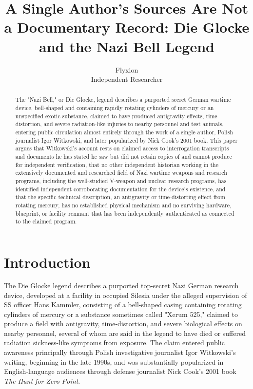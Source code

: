 \documentclass[11pt]{article}
\title{A Single Author's Sources Are Not a Documentary Record: Die Glocke and the Nazi Bell Legend}
\author{Flyxion \\ \small Independent Researcher}
\date{}
\begin{document}
\maketitle

\begin{abstract}
The "Nazi Bell," or Die Glocke, legend describes a purported secret German wartime device, bell-shaped and containing rapidly rotating cylinders of mercury or an unspecified exotic substance, claimed to have produced antigravity effects, time distortion, and severe radiation-like injuries to nearby personnel and test animals, entering public circulation almost entirely through the work of a single author, Polish journalist Igor Witkowski, and later popularized by Nick Cook's 2001 book. This paper argues that Witkowski's account rests on claimed access to interrogation transcripts and documents he has stated he saw but did not retain copies of and cannot produce for independent verification, that no other independent historian working in the extensively documented and researched field of Nazi wartime weapons and research programs, including the well-studied V-weapon and nuclear research programs, has identified independent corroborating documentation for the device's existence, and that the specific technical description, an antigravity or time-distorting effect from rotating mercury, has no established physical mechanism and no surviving hardware, blueprint, or facility remnant that has been independently authenticated as connected to the claimed program.
\end{abstract}

\section{Introduction}

The Die Glocke legend describes a purported top-secret Nazi German research device, developed at a facility in occupied Silesia under the alleged supervision of SS officer Hans Kammler, consisting of a bell-shaped casing containing rotating cylinders of mercury or a substance sometimes called "Xerum 525," claimed to produce a field with antigravity, time-distortion, and severe biological effects on nearby personnel, several of whom are said in the legend to have died or suffered radiation sickness-like symptoms from exposure. The claim entered public awareness principally through Polish investigative journalist Igor Witkowski's writing, beginning in the late 1990s, and was substantially popularized in English-language audiences through defense journalist Nick Cook's 2001 book \emph{The Hunt for Zero Point}.
\end{document}
